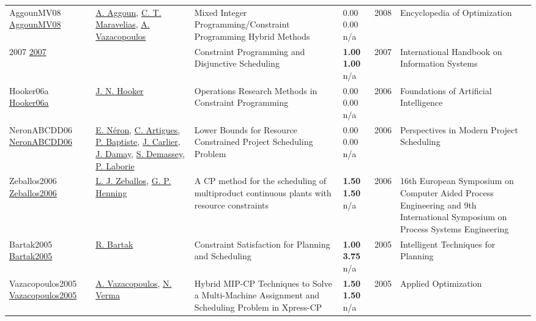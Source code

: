 {\begin{longtable}{p{3cm}p{5cm}p{10cm}p{1cm}rp{2.5cm}l}
AggounMV08 \href{http://dx.doi.org/10.1007/978-0-387-74759-0_396}{AggounMV08} & \hyperref[auth:a724]{A. Aggoun}, \hyperref[auth:a381]{C. T. Maravelias}, \hyperref[auth:a906]{A. Vazacopoulos} & Mixed Integer Programming/Constraint Programming Hybrid Methods & \noindent{}\textcolor{black!50}{0.00} \textcolor{black!50}{0.00} n/a & 2008 & Encyclopedia of Optimization & \cite{AggounMV08}\\
2007 \href{http://dx.doi.org/10.1007/978-3-540-32220-7_13}{2007} &  & Constraint Programming and Disjunctive Scheduling & \noindent{}\textbf{1.00} \textbf{1.00} n/a & 2007 & International Handbook on Information Systems & \cite{2007}\\
Hooker06a \href{http://dx.doi.org/10.1016/s1574-6526(06)80019-2}{Hooker06a} & \hyperref[auth:a160]{J. N. Hooker} & Operations Research Methods in Constraint Programming & \noindent{}\textcolor{black!50}{0.00} \textcolor{black!50}{0.00} n/a & 2006 & Foundations of Artificial Intelligence & \cite{Hooker06a}\\
NeronABCDD06 \href{http://dx.doi.org/10.1007/978-0-387-33768-5_7}{NeronABCDD06} & \hyperref[auth:a898]{E. Néron}, \hyperref[auth:a6]{C. Artigues}, \hyperref[auth:a162]{P. Baptiste}, \hyperref[auth:a844]{J. Carlier}, \hyperref[auth:a899]{J. Damay}, \hyperref[auth:a243]{S. Demassey}, \hyperref[auth:a118]{P. Laborie} & Lower Bounds for Resource Constrained Project Scheduling Problem & \noindent{}\textcolor{black!50}{0.00} \textcolor{black!50}{0.00} n/a & 2006 & Perspectives in Modern Project Scheduling & \cite{NeronABCDD06}\\
Zeballos2006 \href{http://dx.doi.org/10.1016/s1570-7946(06)80335-4}{Zeballos2006} & \hyperref[auth:a620]{L. J. Zeballos}, \hyperref[auth:a587]{G. P. Henning} & A CP method for the scheduling of multiproduct continuous plants with resource constraints & \noindent{}\textbf{1.50} \textbf{1.50} n/a & 2006 & 16th European Symposium on Computer Aided Process Engineering and 9th International Symposium on Process Systems Engineering & \cite{Zeballos2006}\\
Bartak2005 \href{http://dx.doi.org/10.4018/978-1-59140-450-7.ch010}{Bartak2005} & \hyperref[auth:a1480]{R. Bartak} & Constraint Satisfaction for Planning and Scheduling & \noindent{}\textbf{1.00} \textbf{3.75} n/a & 2005 & Intelligent Techniques for Planning & \cite{Bartak2005}\\
Vazacopoulos2005 \href{http://dx.doi.org/10.1007/0-387-26281-4_12}{Vazacopoulos2005} & \hyperref[auth:a906]{A. Vazacopoulos}, \hyperref[auth:a1560]{N. Verma} & Hybrid MIP-CP Techniques to Solve a Multi-Machine Assignment and Scheduling Problem in Xpress-CP & \noindent{}\textbf{1.50} \textbf{1.50} n/a & 2005 & Applied Optimization & \cite{Vazacopoulos2005}\\

\end{longtable}}
